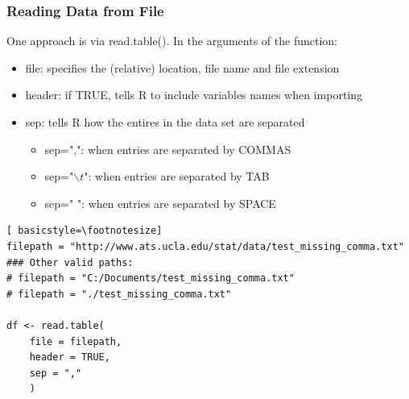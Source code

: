 \begin{frame}
 \frametitle{Reading Data from File}

One approach is via \ttfamily read.table(). \normalfont  In the arguments of the function:
  \begin{itemize}
  \item \ttfamily file: \normalfont specifies the (relative) location, file name and file extension
  \item \ttfamily header: \normalfont if TRUE, tells R to include variables names when importing
  \item \ttfamily sep: \normalfont tells R how the entires in the data set are separated
    \begin{itemize}
      \item \ttfamily sep=",": \normalfont when entries are separated by COMMAS
      \item \ttfamily sep="$\backslash t$":\normalfont \hspace{2.5pt} when entries are separated by TAB
      \item \ttfamily sep=" ": \normalfont when entries are separated by SPACE
    \end{itemize}
   \end{itemize}

\newpage   
   	\begin{lstlisting}[ basicstyle=\footnotesize]
filepath = "http://www.ats.ucla.edu/stat/data/test_missing_comma.txt"
### Other valid paths:
# filepath = "C:/Documents/test_missing_comma.txt"
# filepath = "./test_missing_comma.txt"

df <- read.table(
	file = filepath, 
	header = TRUE, 
	sep = ","
	)
	\end{lstlisting}
\normalfont
\normalsize
\end{frame}

